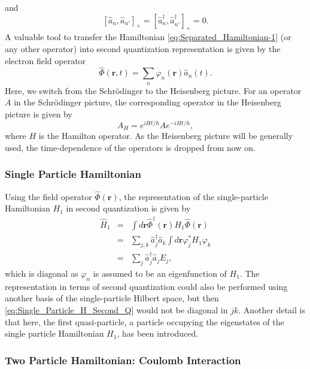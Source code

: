 and\begin{equation}
\left[\hat{a}_{n},\hat{a}_{n'}\right]_{+}=\left[\hat{a}_{n}^{\dagger},\hat{a}_{n'}^{\dagger}\right]_{+}=0.\label{eq:commutation_rel_2}\end{equation}
A valuable tool to transfer the Hamiltonian \ref{eq:Separated_Hamiltonian-1}
(or any other operator) into second quantization representation is
given by the electron field operator\begin{equation}
\hat{\Phi}(\mathbf{r},t)=\sum_{n}\varphi_{n}(\mathbf{r})\hat{a}_{n}(t).\end{equation}
Here, we switch from the Schr\"{o}dinger to the Heisenberg picture.
For an operator $A$ in the Schr\"{o}dinger picture, the corresponding
operator in the Heisenberg picture is given by \begin{equation}
A_{H}=e^{iHt/\hbar}Ae^{-iHt/\hbar},\end{equation}
where $H$ is the Hamilton operator. As the Heisenberg picture will
be generally used, the time-dependence of the operators is dropped
from now on.


\subsubsection{Single Particle Hamiltonian}

Using the field operator $\hat{\Phi}(\mathbf{r})$, the representation
of the single-particle Hamiltonian $H_{1}$ in second quantization
is given by\begin{eqnarray}
\hat{H}_{1} & = & \int d\mathbf{r}\hat{\Phi}^{\dagger}(\mathbf{r})H_{1}\hat{\Phi}(\mathbf{r})\nonumber \\
 & = & \sum_{j,k}\hat{a}_{j}^{\dagger}\hat{a}_{k}\int d\mathbf{r}\varphi_{j}^{*}H_{1}\varphi_{k}\label{eq:Single_Particle_H_Second_Q}\\
 & = & \sum_{j}\hat{a}_{j}^{\dagger}\hat{a}_{j}E_{j},\nonumber \end{eqnarray}
which is diagonal as $\varphi_{n}$ is assumed to be an eigenfunction
of $H_{1}$. The representation in terms of second quantization could
also be performed using another basis of the single-particle Hilbert
space, but then \ref{eq:Single_Particle_H_Second_Q} would not be
diagonal in $jk$. Another detail is that here, the first quasi-particle,
a particle occupying the eigenstates of the single particle Hamiltonian
$H_{1}$, has been introduced.


\subsubsection{Two Particle Hamiltonian: Coulomb Interaction}

